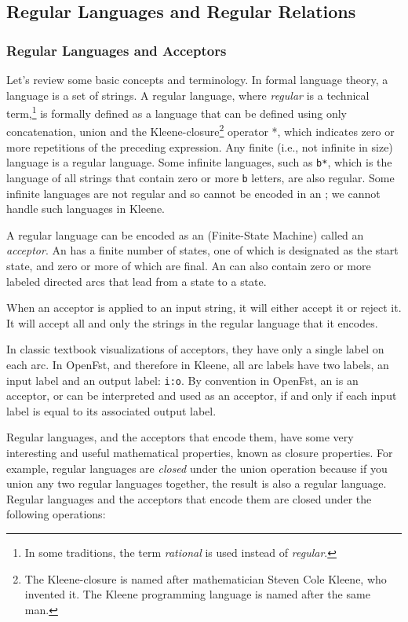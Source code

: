 \subsection{Regular Languages and Regular Relations}

\subsubsection{Regular Languages and Acceptors}

Let's review some basic concepts and terminology.  In formal language theory, a language is a set of strings.  A regular language, where
\emph{regular} is a technical term,\footnote{In some traditions, the term
\emph{rational} is used instead of \emph{regular}.} is formally defined as a language that can be defined
using only concatenation, union and the Kleene-closure\footnote{The Kleene-closure is named
after mathematician Steven Cole Kleene, who invented it.  The Kleene programming language
is named after the same man.} operator *, which indicates zero or
more repetitions of the preceding expression.  Any finite (i.e., not
infinite in size) language is a regular language.  Some infinite languages,
such as \verb!b*!, which is the language of all strings that contain zero or more
\texttt{b} letters, are also regular.  Some infinite languages are not regular
and so cannot be encoded in an \fsm{}; we cannot handle such languages in Kleene.

A regular language can be encoded as an \fsm{} (Finite-State Machine) called an
\emph{acceptor}.  An \fsm{} has a finite number of states, one of which is designated as the
start state, and zero or more of which are final.  An \fsm{} can also contain zero or
more labeled directed arcs that lead from a state to a state.

When an acceptor is applied to an input string, it will either accept it or reject it.  It
will accept all and only the strings in the regular language that it encodes.

In classic textbook visualizations of acceptors, they have only a single label on
each arc.  In OpenFst, and therefore in Kleene, all arc labels have two labels, an input
label and an output label: \verb!i:o!.  By convention in OpenFst, an \fsm{} is an acceptor,
or can be interpreted and used as an acceptor,
if and only if each input label is equal to its associated output label.

Regular languages, and the acceptors that encode them, have some very interesting and
useful
mathematical properties, known as closure properties.  For example, regular languages are
\emph{closed} under the union operation because if you union any two regular languages together, the
result is also a regular language.  Regular languages and the acceptors that
encode them are closed under the following
operations:

